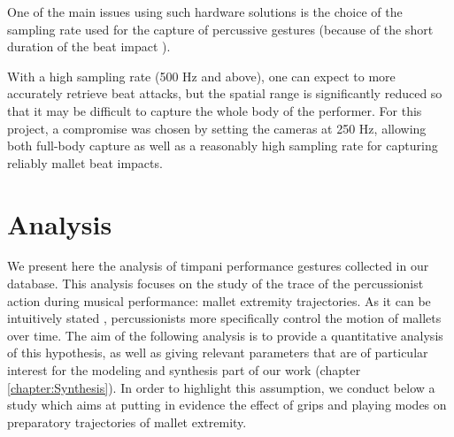 
One of the main issues using such hardware solutions is the choice of the sampling rate used for the capture of percussive gestures (because of the short duration of the beat impact ).

With a high sampling rate (500 Hz and above), one can expect to more accurately retrieve beat attacks, but the spatial range is significantly reduced so that it may be difficult to capture the whole body of the performer.  For this project, a compromise was chosen by setting the cameras at 250 Hz, allowing both full-body capture as well as a reasonably high sampling rate for capturing reliably mallet beat impacts. 






	\section{Analysis}
	\label{sec:Analysis_TimpaniAnalysis}

We present here the analysis of timpani performance gestures collected in our database. This analysis focuses on the study of the trace of the percussionist action during musical performance: mallet extremity trajectories. As it can be intuitively stated , percussionists more specifically control the motion of mallets over time. The aim of the following analysis is to provide a quantitative analysis of this hypothesis, as well as giving relevant parameters that are of particular interest for the modeling and synthesis part of our work (chapter \ref{chapter:Synthesis}). In order to highlight this assumption, we conduct below a study which aims at putting in evidence the effect of grips and playing modes on preparatory trajectories of mallet extremity.


